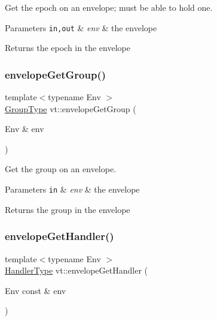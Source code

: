 Get the epoch on an envelope; must be able to hold one. 


\begin{DoxyParams}[1]{Parameters}
\mbox{\tt in,out}  & {\em env} & the envelope\\
\hline
\end{DoxyParams}
\begin{DoxyReturn}{Returns}
the epoch in the envelope 
\end{DoxyReturn}
\mbox{\label{namespacevt_a76b9bdf05b27d6470bac66186c32d9eb}} 
\subsubsection{\texorpdfstring{envelope\+Get\+Group()}{envelopeGetGroup()}}
{\footnotesize\ttfamily template$<$typename Env $>$ \\
\hyperlink{namespacevt_a27b5e4411c9b6140c49100e050e2f743}{Group\+Type} vt\+::envelope\+Get\+Group (\begin{DoxyParamCaption}\item[{Env \&}]{env }\end{DoxyParamCaption})\hspace{0.3cm}{\ttfamily [inline]}}



Get the group on an envelope. 


\begin{DoxyParams}[1]{Parameters}
\mbox{\tt in}  & {\em env} & the envelope\\
\hline
\end{DoxyParams}
\begin{DoxyReturn}{Returns}
the group in the envelope 
\end{DoxyReturn}
\mbox{\label{namespacevt_ad3c1fff07670b717ba492d97e9eecc48}} 
\subsubsection{\texorpdfstring{envelope\+Get\+Handler()}{envelopeGetHandler()}}
{\footnotesize\ttfamily template$<$typename Env $>$ \\
\hyperlink{namespacevt_af64846b57dfcaf104da3ef6967917573}{Handler\+Type} vt\+::envelope\+Get\+Handler (\begin{DoxyParamCaption}\item[{Env const \&}]{env }\end{DoxyParamCaption})\hspace{0.3cm}{\ttfamily [inline]}}



